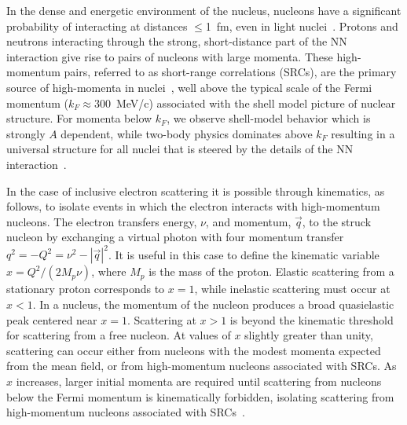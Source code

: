 \documentclass[aps,prl,superscriptaddress,showpacs,twocolumn,floatfix,amsmath,amssymb]{revtex4-1}
\begin{document}

In the dense and energetic environment of the nucleus, nucleons have a significant probability of
interacting at distances $\le$1~fm, even in light nuclei~\cite{carlson14,lu13}. Protons and neutrons
interacting through the strong, short-distance part of the NN interaction give rise to pairs of
nucleons with large momenta. These high-momentum pairs, referred to as short-range correlations (SRCs), are
the primary source of high-momenta in nuclei~\cite{Frankfurt1981215, SLAC_Measurement_PRC.48.2451,
src_john}, well above the typical scale of the Fermi momentum ($k_F \approx 300$~MeV/c) associated with the
shell model picture of nuclear structure. For momenta below $k_F$, we observe shell-model behavior which is
strongly $A$ dependent, while two-body physics dominates above $k_F$ resulting in a universal
structure for all nuclei that is steered by the details of the NN interaction~\cite{RevModPhys.80.189,
PhysRevC.53.1689, wiringa14}.

In the case of inclusive electron scattering it is possible  through kinematics, as follows, to isolate events in which the electron interacts with  high-momentum nucleons. The electron transfers energy, $\nu$, and momentum, $\vec{q}$, to the struck nucleon by exchanging
a virtual photon with four momentum transfer $q^2 = - Q^{2} = \nu^{2}-|\vec{q}|^{2}$. It is useful in this
case to define the kinematic variable $x = Q^2/(2M_p\nu)$, where $M_p$ is the mass of the proton. Elastic
scattering from a stationary proton corresponds to $x=1$, while inelastic scattering must occur at $x<1$. In
a nucleus, the momentum of the nucleon produces a broad quasielastic peak centered near $x=1$. 
Scattering at $x>1$ is beyond the kinematic threshold for scattering from a free nucleon. At values of $x$ slightly greater than unity, scattering can occur either from nucleons with the modest momenta expected from the mean field, or from high-momentum nucleons associated with SRCs. As $x$
increases, larger initial momenta are required until scattering from nucleons below the Fermi
momentum is kinematically forbidden, isolating scattering from high-momentum nucleons associated with
SRCs~\cite{RevModPhys.80.189, PhysRevC.53.1689, src_john, egiyan2003}.
\end{document}
